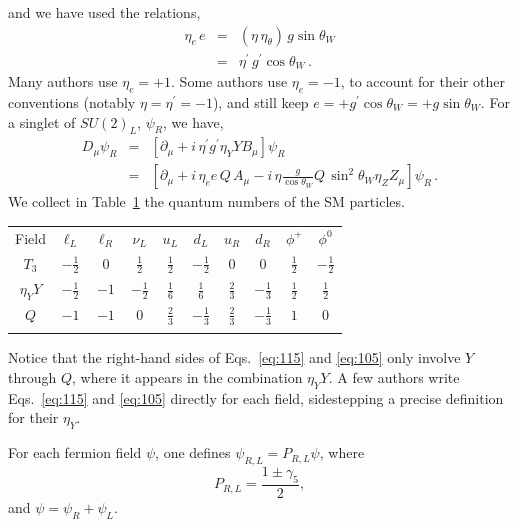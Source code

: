 \documentclass{ws-ijmpa}
\begin{document}
%
and we have used the relations,
%
\begin{eqnarray}
  \eta_e \,e
&=&
(\eta\, \eta_\theta)\, g \sin\theta_W
\nonumber\\
&=& 
\eta^\prime\, g^\prime \cos\theta_W\, .
\label{eq:49}
\end{eqnarray}
%
Many authors use $\eta_e=+1$.
Some authors use $\eta_e=-1$,
to account for their other conventions
(notably $\eta=\eta^\prime=-1$),
and still keep $e =  + g^\prime \cos{\theta_W} = + g \sin{\theta_W}$.
For a singlet of $SU(2)_L$, $\psi_R$, we have,
%
\begin{eqnarray}
  D_\mu \psi_R
&=& \left[ \partial_\mu  
+ i\, \eta^\prime g^\prime\eta_Y Y B_\mu \right] \psi_R 
\nonumber\\[+2mm]
&=& \left[ \partial_\mu  +i\, \eta_e  e\, Q\,   A_\mu
- i\, \eta \frac{ g}{\cos\theta_W}  Q\, \sin^2\theta_W 
\eta_Z Z_\mu \right] \psi_R\, .
\label{eq:105}
\end{eqnarray}
%
We collect in Table~\ref{tab:SM} the quantum numbers of the SM
particles. 

\begin{table}[ph]
{\begin{tabular}{@{}cccccccccc@{}} \toprule
Field& $\ell_L$&$\ell_R$& $\nu_L$&  
$u_L$ &$d_L$ &$u_R$ &$d_R$ & $\phi^+$& $\phi^0$ 
\\[+2mm]
\colrule
$T_3$ & $-\tfrac{1}{2}$&$0$& $\tfrac{1}{2}$&$\tfrac{1}{2}$&
$-\tfrac{1}{2}$& $0$& $0$ &$\tfrac{1}{2}$&$-\tfrac{1}{2}$
\\[+2mm]
$\eta_Y Y$ &$-\tfrac{1}{2}$&$-1$&$-\tfrac{1}{2}$&$\tfrac{1}{6}$&$\tfrac{1}{6}$
&$\tfrac{2}{3}$&$-\tfrac{1}{3}$&$\tfrac{1}{2}$ &$\tfrac{1}{2}$
\\[+2mm]
$Q$&$-1$&$-1$&$0$&$\tfrac{2}{3}$&$-\tfrac{1}{3}$&$\tfrac{2}{3}$&$-\tfrac{1}{3}$
&$1$&$0$
\\[+2mm]
\botrule
\end{tabular} \label{tab:SM}}
\end{table}

Notice that the right-hand sides of
Eqs.~\eqref{eq:115} and \eqref{eq:105} only involve
$Y$ through $Q$,
where it appears in the combination $\eta_Y Y$.
A few authors write Eqs.~\eqref{eq:115} and \eqref{eq:105} directly for each field,
sidestepping a precise definition for their $\eta_Y$.

For each fermion field $\psi$,
one defines
$\psi_{R,L} = P_{R,L} \psi$,
where
%
\begin{equation}
P_{R,L} = \frac{1 \pm \gamma_5}{2},
\end{equation}
%
and $\psi = \psi_R + \psi_L$.
\end{document}
